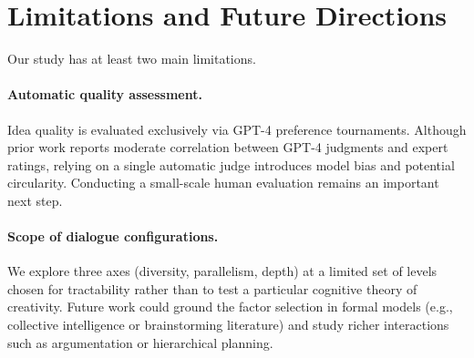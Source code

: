 \documentclass[11pt]{article}
\begin{document}
\section{Limitations and Future Directions}

Our study has at least two main limitations.

\paragraph{Automatic quality assessment.} Idea quality is evaluated exclusively via GPT-4 preference tournaments.  Although prior work reports moderate correlation between GPT-4 judgments and expert ratings, relying on a single automatic judge introduces model bias and potential circularity. Conducting a small-scale human evaluation remains an important next step.

\paragraph{Scope of dialogue configurations.} We explore three axes (diversity, parallelism, depth) at a limited set of levels chosen for tractability rather than to test a particular cognitive theory of creativity. Future work could ground the factor selection in formal models (e.g., collective intelligence or brainstorming literature) and study richer interactions such as argumentation or hierarchical planning.




\clearpage
\onecolumn
\appendix

\end{document}
